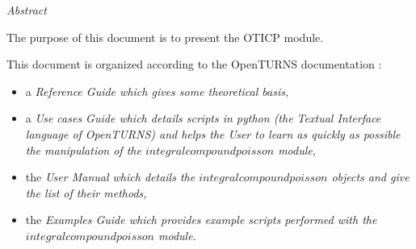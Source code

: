 %  
\vspace{0.5in}
\begin{center}
\vspace{0.3in}
\emph{ Abstract}
\vspace{0.5in}
\end{center}

The purpose of this document is to present the OTICP module.

This document is organized according to the OpenTURNS documentation :
\begin{itemize}
\item a \itshape{Reference Guide} which gives some theoretical basis,
\item a \itshape{Use cases Guide} which details scripts in python (the Textual Interface language of OpenTURNS) and helps the User to learn as quickly as possible the manipulation of the $integralcompoundpoisson$ module,
\item the \itshape{User Manual} which details the $integralcompoundpoisson$ objects and give the list of their methods,
\item the \itshape{Examples Guide} which provides example scripts performed with the $integralcompoundpoisson$ module.
\end{itemize}

